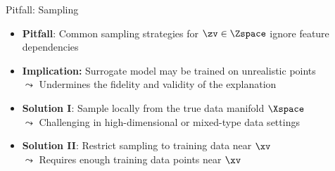 \documentclass[11pt,compress,t,notes=noshow, aspectratio=169, xcolor=table]{beamer}
\begin{document}
\begin{frame}{Pitfall: Sampling}
	\begin{itemize}
	\itemsep1em
	  \item \textbf{Pitfall}: Common sampling strategies for $\zv \in \Zspace$ ignore feature dependencies
        \item \textbf{Implication:} Surrogate model may be trained on unrealistic points\\
  $\leadsto$ Undermines the fidelity and validity of the explanation
      \pause
      \item \textbf{Solution I}: Sample locally from the true data manifold $\Xspace$\\
  $\leadsto$ Challenging in high-dimensional or mixed-type data settings
      \item \textbf{Solution II}: Restrict sampling to training data near $\xv$\\
      $\leadsto$ Requires enough training data points near $\xv$
    \end{itemize}
    
\end{frame}
\end{document}
